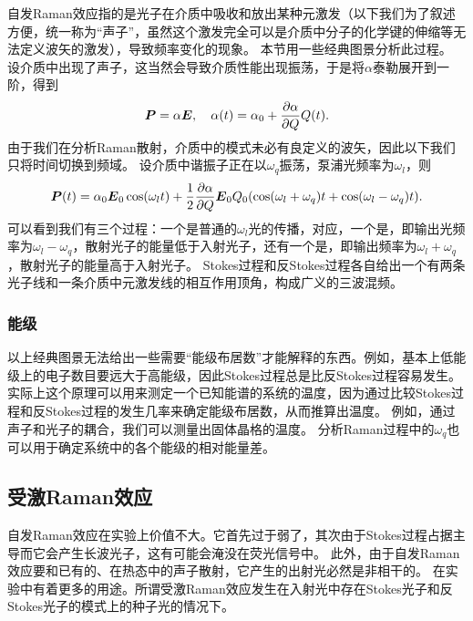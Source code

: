 自发Raman效应指的是光子在介质中吸收和放出某种元激发（以下我们为了叙述方便，统一称为“声子”，虽然这个激发完全可以是介质中分子的化学键的伸缩等无法定义波矢的激发），导致频率变化的现象。
本节用一些经典图景分析此过程。
设介质中出现了声子，这当然会导致介质性能出现振荡，于是将$\alpha$泰勒展开到一阶，得到
\begin{equation}
    \vb*{P} = \alpha \vb*{E}, \quad \alpha(t) = \alpha_0 + \pdv{\alpha}{Q} Q(t).
\end{equation}
由于我们在分析Raman散射，介质中的模式未必有良定义的波矢，因此以下我们只将时间切换到频域。
设介质中谐振子正在以$\omega_q$振荡，泵浦光频率为$\omega_l$，则
\begin{equation}
    \vb*{P}(t) = \alpha_0 \vb*{E}_0 \cos(\omega_l t) + \frac{1}{2} \pdv{\alpha}{Q} \vb*{E}_0 Q_0 (\cos(\omega_l + \omega_q) t + \cos(\omega_l - \omega_q)t).
\end{equation}
可以看到我们有三个过程：一个是普通的$\omega_l$光的传播，对应，一个是，即输出光频率为$\omega_l - \omega_q$，散射光子的能量低于入射光子，还有一个是，即输出频率为$\omega_l + \omega_q$，散射光子的能量高于入射光子。
Stokes过程和反Stokes过程各自给出一个有两条光子线和一条介质中元激发线的相互作用顶角，构成广义的三波混频。

\subsubsection{能级}

以上经典图景无法给出一些需要“能级布居数”才能解释的东西。例如，基本上低能级上的电子数目要远大于高能级，因此Stokes过程总是比反Stokes过程容易发生。
实际上这个原理可以用来测定一个已知能谱的系统的温度，因为通过比较Stokes过程和反Stokes过程的发生几率来确定能级布居数，从而推算出温度。
例如，通过声子和光子的耦合，我们可以测量出固体晶格的温度。
分析Raman过程中的$\omega_q$也可以用于确定系统中的各个能级的相对能量差。

\subsection{受激Raman效应}

自发Raman效应在实验上价值不大。它首先过于弱了，其次由于Stokes过程占据主导而它会产生长波光子，这有可能会淹没在荧光信号中。
此外，由于自发Raman效应要和已有的、在热态中的声子散射，它产生的出射光必然是非相干的。
在实验中有着更多的用途。所谓受激Raman效应发生在入射光中存在Stokes光子和反Stokes光子的模式上的种子光的情况下。

